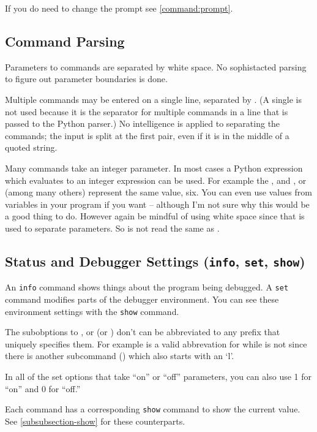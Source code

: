 If you do need to change the prompt see \ref{command:prompt}.

\subsection{Command Parsing}
Parameters to commands are separated by white space. No sophistacted
parsing to figure out parameter boundaries is done.

Multiple commands may be entered on a single line, separated by
\samp{;;}.  (A single \samp{;} is not used because it is the separator
for multiple commands in a line that is passed to the Python parser.)
No intelligence is applied to separating the commands; the input is
split at the first \samp{;;} pair, even if it is in the middle of a
quoted string.

Many commands take an integer parameter. In most cases a Python
expression which evaluates to an integer expression can be used. For
example the ,  and , or 
(among many others) represent the same value, six. You can even use
values from variables in your program if you want -- although I'm not
sure why this would be a good thing to do. However again be mindful of
using white space since that is used to separate parameters. So
 is not read the same as .

\subsection{Status and Debugger Settings ({\tt info}, {\tt set}, {\tt show})\label{subsection-status}}

An {\tt info} command shows things about the program being debugged. A
{\tt set} command modifies parts of the debugger environment. You can
see these environment settings with the {\tt show} command.

The subobptions to , or  (or ) don't
can be abbreviated to any prefix that uniquely specifies them. For
example  is a valid abbrevation for 
while  is not since there is another subcommand
() which also starts with an `l'.

In all of the set options that take ``on'' or ``off'' parameters, you
can also use 1 for ``on'' and 0 for ``off.''

Each command has a corresponding {\tt show} command to show the current
value. See \ref{subsubsection-show} for these counterparts.

